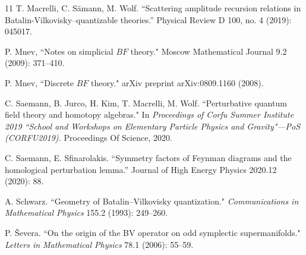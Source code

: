 \documentclass{amsart}
\theoremstyle{plain} %
\theoremstyle{definition}
\theoremstyle{remark}
\begin{document}
\begin{thebibliography}{11}
T. Macrelli, C. S\"amann, M. Wolf. ``Scattering amplitude recursion relations in Batalin-Vilkovisky–quantizable theories.'' Physical Review D 100, no. 4 (2019): 045017.

 P. Mnev, ``Notes on simplicial $BF$ theory." Moscow Mathematical Journal 9.2 (2009): 371--410.

 P. Mnev, ``Discrete $BF$ theory." arXiv preprint arXiv:0809.1160 (2008).

C. Saemann, B. Jurco, H. Kim, T. Macrelli, M. Wolf. ``Perturbative quantum field theory and homotopy algebras." In \textit{Proceedings of Corfu Summer Institute 2019 ``School and Workshops on Elementary Particle Physics and Gravity"---PoS (CORFU2019).} Proceedings Of Science, 2020.

 C. Saemann, E. Sfinarolakis. ``Symmetry factors of Feynman diagrams and the homological perturbation lemma.'' Journal of High Energy Physics 2020.12 (2020): 88.

 A. Schwarz. ``Geometry of Batalin--Vilkovisky quantization." \textit{Communications in Mathematical Physics} 155.2 (1993): 249--260.

 P. \v{S}evera. ``On the origin of the BV operator on odd symplectic supermanifolds." \textit{Letters in Mathematical Physics} 78.1 (2006): 55--59.
\end{thebibliography}
\end{document}
